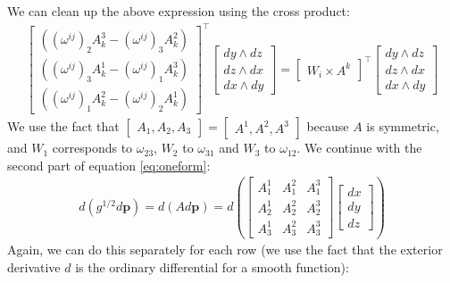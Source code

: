 \documentclass[../thesis.tex]{subfiles}
\begin{document}
We can clean up the above expression using the cross product:
\begin{align*}
  \begin{bmatrix}
    ((\omega^{ij})_2A^3_k - (\omega^{ij})_3A^2_k) \\
    ((\omega^{ij})_3A^1_k - (\omega^{ij})_1A^3_k) \\
    ((\omega^{ij})_1A^2_k - (\omega^{ij})_2A^1_k) 
  \end{bmatrix}^{\top}
  \begin{bmatrix}
    dy \wedge dz \\
    dz \wedge dx \\
    dx \wedge dy 
  \end{bmatrix} = 
  \begin{bmatrix}
    W_i \times A^k
  \end{bmatrix}^{\top}
  \begin{bmatrix}
    dy \wedge dz \\
    dz \wedge dx \\
    dx \wedge dy 
  \end{bmatrix}
\end{align*}
We use the fact that $\begin{bmatrix}
  A_1, A_2, A_3 
\end{bmatrix} = \begin{bmatrix}
  A^1, A^2, A^3
\end{bmatrix}$ because $A$ is symmetric, and $W_1$ corresponds to $\omega_{23}$, $W_2$ to $\omega_{31}$ and $W_3$ to $\omega_{12}$.
We continue with the second part of equation \ref{eq:oneform}:
\begin{align*}
  d(g^{1/2}d\bm{p})= d(Ad\bm{p}) = d\left(\begin{bmatrix}
    A^1_1 & A^2_1 & A^3_1 \\
    A^1_2 & A^2_2 & A^3_2 \\
    A^1_3 & A^2_3 & A^3_3
  \end{bmatrix}
  \begin{bmatrix}
    dx \\ dy \\ dz
  \end{bmatrix}
  \right)
\end{align*}
Again, we can do this separately for each row (we use the fact that the exterior derivative $d$ is the ordinary differential for a smooth function):
\end{document}
